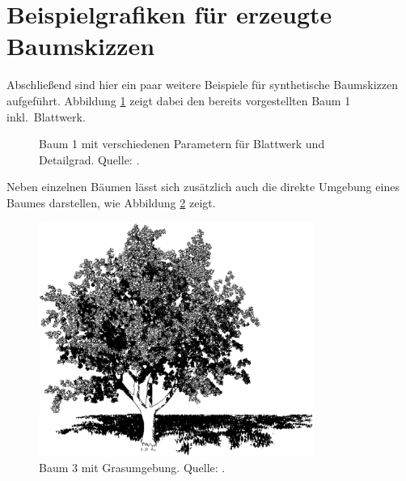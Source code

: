 \section{Beispielgrafiken für erzeugte Baumskizzen}
Abschließend sind hier ein paar weitere Beispiele für synthetische Baumskizzen
aufgeführt. Abbildung \ref{fig:baum1-varianten} zeigt dabei den bereits
vorgestellten Baum 1 inkl.\ Blattwerk.

\begin{figure}
  \centering
  \qquad
  \caption{Baum 1 mit verschiedenen Parametern für Blattwerk und Detailgrad.
  Quelle: \cite{Deussen2000}.}
  \label{fig:baum1-varianten}
\end{figure}

Neben einzelnen Bäumen lässt sich zusätzlich auch die direkte Umgebung eines
Baumes darstellen, wie Abbildung \ref{fig:baum-gross} zeigt.

\begin{figure}
  \centering
  \includegraphics[width=0.8\textwidth]{../images/Deussen2000-tree-large}
  \caption{Baum 3 mit Grasumgebung. Quelle: \cite{Deussen2000}.}
  \label{fig:baum-gross}
\end{figure}